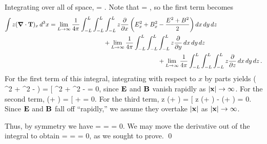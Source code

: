 \begin{solution}
	Integrating over all of space,
	\beq
		\int {} \dcx =  \dcx.
	\eeq
	Note that
	\beq
		\int {} \dcx = \limLi \intLL \intLL \intLL {} \dx \dy \dz,
	\eeq
	so the first term becomes
	\begin{align*}
		\int z (\grad \cdot \vb{T})_x \dd[3]{x} &= \lim_{L \to \infty} \frac{1}{4\pi} \int_{-L}^L \int_{-L}^L \int_{-L}^L z \pdv{}{x} \left( E_x^2 + B_x^2 - \frac{E^2 + B^2}{2} \right) \dd{x} \dd{y} \dd{z} \\
		&\phantom{mmmmmmmmmm} + \lim_{L \to \infty} \frac{1}{4\pi} \int_{-L}^L \int_{-L}^L \int_{-L}^L z \pdv{}{y} (E_x E_y + B_x B_y) \dd{x} \dd{y} \dd{z} \\
		&\phantom{mmmmmmmmmmmmmmmmmmmm} + \lim_{L \to \infty} \frac{1}{4\pi} \int_{-L}^L \int_{-L}^L \int_{-L}^L z \pdv{}{z} (E_x E_z + B_x B_z) \dd{x} \dd{y} \dd{z}.
	\end{align*}
	For the first term of this integral, integrating with respect to $x$ by parts yields
	\beq
		\limLi \intLL {} \left( \Ex^2 + \Bx^2 -  \right) \dx = \limLi \bigg[ \Ex^2 + \Bx^2 -  \bigLL = 0,
	\eeq
	since $\vb{E}$ and $\vb{B}$ vanish rapidly as $\abs{\vb{x}} \to \infty$.  For the second term,
	\beq
		\intLL {} (\Ex \Ey + \Bx \By) \dy = \limLi \bigg[ \Ex \Ey + \Bx \By \bigLL = 0.
	\eeq
	For the third term,
	\beq
		\intLL z  (\Ex \Ez + \Bx \Bz) \dz = \limLi \bigg[ z (\Ex \Ez + \Bx \Bz) \bigLL - \limLi \intLL (\Ex \Ez + \Bx \Bz) \dz = 0.
	\eeq
	Since $\vb{E}$ and $\vb{B}$ fall off ``rapidly,'' we assume they overtake $\abs{\vb{x}}$ as $\abs{\vb{x}} \to \infty$.
	
	Thus, by symmetry we have
	\beq
		\int {} \dcx = \int {} \dcx = \int {} \dcx = 0.
	\eeq
	We may move the derivative out of the integral to obtain
	\beq
		 =  \int \vl \dcx = \int {} \dcx = 0,
	\eeq
	as we sought to prove. \qed
\end{solution}